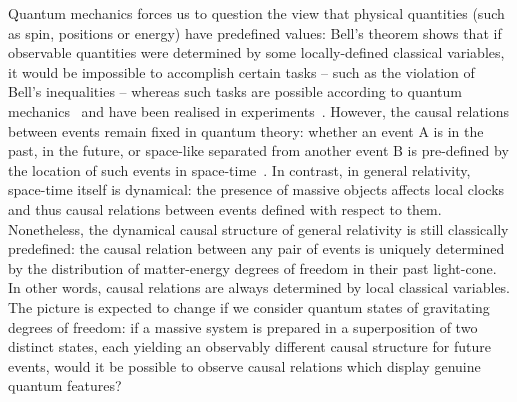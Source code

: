 \documentclass[a4paper,11pt]{article}
\begin{document}
Quantum mechanics forces us to question the view that physical quantities (such as spin, positions or energy) have predefined values:
Bell's  theorem shows that if observable quantities were determined by some locally-defined {classical} variables, it would be impossible to accomplish certain tasks -- such as the violation of Bell's inequalities -- whereas such tasks are possible according to quantum mechanics~\cite{bell64, Clauser1969} {and have been realised in experiments~\cite{Clauser:1972, hensen2015experimental, Giustina2015, Shalm2015}}. However, the {causal relations} between events remain fixed in quantum theory: whether an event $\mathrm A$ is in the past, in the future, or space-like separated from another event $\mathrm B$ is pre-defined by the location of such events in space-time~\cite{Hardy:2005, Hardy:2007bk}. In contrast, in general relativity, space-time itself is dynamical: the presence of massive objects affects local clocks and thus %
causal relations between events defined with respect to them. %
Nonetheless, the dynamical causal structure of general relativity is still classically predefined: the causal relation between any pair of events is uniquely determined by the distribution of matter-energy degrees of freedom in their past light-cone. In other words, causal relations are always determined by local classical variables. The picture is expected to change if we consider quantum states of gravitating degrees of freedom: if a massive system is prepared in a superposition of two distinct states, each yielding an observably different causal structure for future events, would it be possible to observe causal relations which display genuine quantum features?  
\end{document}
